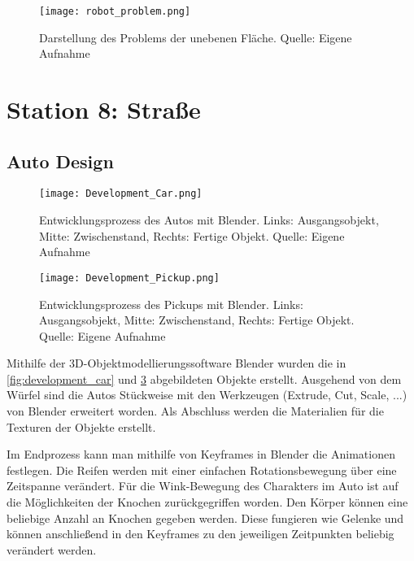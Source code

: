 \begin{figure}[H]
	\centering
	\texttt{[image: robot\_problem.png]}
	\caption[Darstellung des Problems der unebenen Fläche]{Darstellung des Problems der unebenen Fläche. Quelle: Eigene Aufnahme}
	\label{fig:robot_problem}
\end{figure}



\section{Station 8: Straße}
\subsection{Auto Design}
\begin{figure}[H]
	\centering
	\texttt{[image: Development\_Car.png]}
	\caption[Entwicklungsprozess des Autos mit Blender]{Entwicklungsprozess des Autos mit Blender. Links: Ausgangsobjekt, Mitte: Zwischenstand, Rechts: Fertige Objekt. Quelle: Eigene Aufnahme}
	\label{fig:development_car}
\end{figure}

\begin{figure}[H]
	\centering
	\texttt{[image: Development\_Pickup.png]}
	\caption[Entwicklungsprozess des Pickups mit Blender]{Entwicklungsprozess des Pickups mit Blender. Links: Ausgangsobjekt, Mitte: Zwischenstand, Rechts: Fertige Objekt. Quelle: Eigene Aufnahme}
	\label{fig:development_pickup}
\end{figure}

Mithilfe der 3D-Objektmodellierungssoftware Blender wurden die in \autoref{fig:development_car} und \ref{fig:development_pickup} abgebildeten Objekte erstellt. Ausgehend von dem Würfel sind die Autos Stückweise mit den Werkzeugen (Extrude, Cut, Scale, ...) von Blender erweitert worden. Als Abschluss werden die Materialien für die Texturen der Objekte erstellt.

Im Endprozess kann man mithilfe von Keyframes in Blender die Animationen festlegen. Die Reifen werden mit einer einfachen Rotationsbewegung über eine Zeitspanne verändert. Für die Wink-Bewegung des Charakters im Auto ist auf die Möglichkeiten der Knochen zurückgegriffen worden. Den Körper können eine beliebige Anzahl an Knochen gegeben werden. Diese fungieren wie Gelenke und können anschließend in den Keyframes zu den jeweiligen Zeitpunkten beliebig verändert werden.

